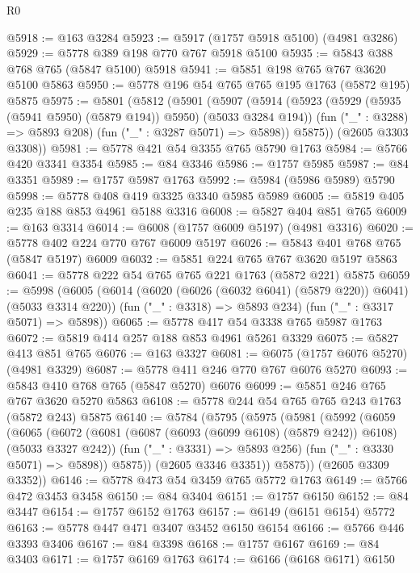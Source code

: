 \begin{lexlean}{R0}
\begin{coremodule}
@5918 := @163 @3284
@5923 := @5917 (@1757 @5918 @5100) (@4981 @3286)
@5929 := @5778 @389 @198 @770 @767 @5918 @5100
@5935 := @5843 @388 @768 @765 (@5847 @5100) @5918
@5941 := @5851 @198 @765 @767 @3620 @5100 @5863
@5950 := @5778 @196 @54 @765 @765 @195 @1763 (@5872 @195) @5875
@5975 := @5801
    (@5812
      (@5901
        (@5907
          (@5914
            (@5923 (@5929 (@5935 (@5941 @5950) (@5879 @194)) @5950) (@5033 @3284 @194))
            (fun ("_" : @3288) => @5893 @208)
            (fun ("_" : @3287 @5071) => @5898))
          @5875))
      (@2605 @3303 @3308))
@5981 := @5778 @421 @54 @3355 @765 @5790 @1763
@5984 := @5766 @420 @3341 @3354
@5985 := @84 @3346
@5986 := @1757 @5985
@5987 := @84 @3351
@5989 := @1757 @5987 @1763
@5992 := @5984 (@5986 @5989) @5790
@5998 := @5778 @408 @419 @3325 @3340 @5985 @5989
@6005 := @5819 @405 @235 @188 @853 @4961 @5188 @3316
@6008 := @5827 @404 @851 @765
@6009 := @163 @3314
@6014 := @6008 (@1757 @6009 @5197) (@4981 @3316)
@6020 := @5778 @402 @224 @770 @767 @6009 @5197
@6026 := @5843 @401 @768 @765 (@5847 @5197) @6009
@6032 := @5851 @224 @765 @767 @3620 @5197 @5863
@6041 := @5778 @222 @54 @765 @765 @221 @1763 (@5872 @221) @5875
@6059 := @5998
    (@6005
      (@6014 (@6020 (@6026 (@6032 @6041) (@5879 @220)) @6041) (@5033 @3314 @220))
      (fun ("_" : @3318) => @5893 @234)
      (fun ("_" : @3317 @5071) => @5898))
@6065 := @5778 @417 @54 @3338 @765 @5987 @1763
@6072 := @5819 @414 @257 @188 @853 @4961 @5261 @3329
@6075 := @5827 @413 @851 @765
@6076 := @163 @3327
@6081 := @6075 (@1757 @6076 @5270) (@4981 @3329)
@6087 := @5778 @411 @246 @770 @767 @6076 @5270
@6093 := @5843 @410 @768 @765 (@5847 @5270) @6076
@6099 := @5851 @246 @765 @767 @3620 @5270 @5863
@6108 := @5778 @244 @54 @765 @765 @243 @1763 (@5872 @243) @5875
@6140 := @5784
    (@5795
      (@5975
        (@5981
          (@5992
            (@6059
              (@6065
                (@6072
                  (@6081 (@6087 (@6093 (@6099 @6108) (@5879 @242)) @6108) (@5033 @3327 @242))
                  (fun ("_" : @3331) => @5893 @256)
                  (fun ("_" : @3330 @5071) => @5898))
                @5875))
            (@2605 @3346 @3351))
          @5875))
      (@2605 @3309 @3352))
@6146 := @5778 @473 @54 @3459 @765 @5772 @1763
@6149 := @5766 @472 @3453 @3458
@6150 := @84 @3404
@6151 := @1757 @6150
@6152 := @84 @3447
@6154 := @1757 @6152 @1763
@6157 := @6149 (@6151 @6154) @5772
@6163 := @5778 @447 @471 @3407 @3452 @6150 @6154
@6166 := @5766 @446 @3393 @3406
@6167 := @84 @3398
@6168 := @1757 @6167
@6169 := @84 @3403
@6171 := @1757 @6169 @1763
@6174 := @6166 (@6168 @6171) @6150

\end{coremodule}
\end{lexlean}
